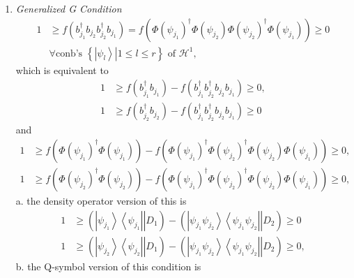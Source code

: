 \documentclass[aps,preprint]{revtex4}%
\begin{document}
\begin{enumerate}
\item \emph{Generalized G Condition }
\begin{align}
1  &  \geq f\left(  b_{j_{1}}^{\dagger}b_{j_{2}}b_{j_{2}}^{\dagger}b_{j_{1}%
}\right)  =f\left(  \Phi\left(  \psi_{j_{1}}\right)  ^{\dagger}\Phi\left(
\psi_{j_{2}}\right)  \Phi\left(  \psi_{j_{2}}\right)  ^{\dagger}\Phi\left(
\psi_{j_{1}}\right)  \right)  \geq0\nonumber\\
&  \forall\text{conb's }\left\{  \left.  \left\vert \psi_{l}\right\rangle
\right\vert 1\leq l\leq r\right\}  \text{ of }\mathcal{H}^{1},
\end{align}
which is equivalent to
\begin{align}
1  &  \geq f\left(  b_{j_{1}}^{\dagger}b_{j_{1}}\right)  -f\left(  b_{j_{1}%
}^{\dagger}b_{j_{2}}^{\dagger}b_{j_{2}}b_{j_{1}}\right)  \geq0,\nonumber\\
1  &  \geq f\left(  b_{j_{2}}^{\dagger}b_{j_{2}}\right)  -f\left(  b_{j_{1}%
}^{\dagger}b_{j_{2}}^{\dagger}b_{j_{2}}b_{j_{1}}\right)  \geq0
\end{align}
and%
\begin{align}
1  &  \geq f\left(  \Phi\left(  \psi_{j_{1}}\right)  ^{\dagger}\Phi\left(
\psi_{j_{1}}\right)  \right)  -f\left(  \Phi\left(  \psi_{j_{1}}\right)
^{\dagger}\Phi\left(  \psi_{j_{2}}\right)  ^{\dagger}\Phi\left(  \psi_{j_{2}%
}\right)  \Phi\left(  \psi_{j_{1}}\right)  \right)  \geq0,\nonumber\\
1  &  \geq f\left(  \Phi\left(  \psi_{j_{2}}\right)  ^{\dagger}\Phi\left(
\psi_{j_{2}}\right)  \right)  -f\left(  \Phi\left(  \psi_{j_{1}}\right)
^{\dagger}\Phi\left(  \psi_{j_{2}}\right)  ^{\dagger}\Phi\left(  \psi_{j_{2}%
}\right)  \Phi\left(  \psi_{j_{1}}\right)  \right)  \geq0,
\end{align}
a. the density operator version of this is
\begin{align}
1  &  \geq\left(  \left.  \left\vert \psi_{j_{1}}\right\rangle \left\langle
\psi_{j_{1}}\right\vert \right\vert D_{1}\right)  -\left(  \left.  \left\vert
\psi_{j_{1}}\psi_{j_{2}}\right\rangle \left\langle \psi_{j_{1}}\psi_{j_{2}%
}\right\vert \right\vert D_{2}\right)  \geq0\nonumber\\
1  &  \geq\left(  \left.  \left\vert \psi_{j_{2}}\right\rangle \left\langle
\psi_{j_{2}}\right\vert \right\vert D_{1}\right)  -\left(  \left.  \left\vert
\psi_{j_{1}}\psi_{j_{2}}\right\rangle \left\langle \psi_{j_{1}}\psi_{j_{2}%
}\right\vert \right\vert D_{2}\right)  \geq0,
\end{align}
b. the Q-symbol version of this condition is%

\end{enumerate}
\end{document}
